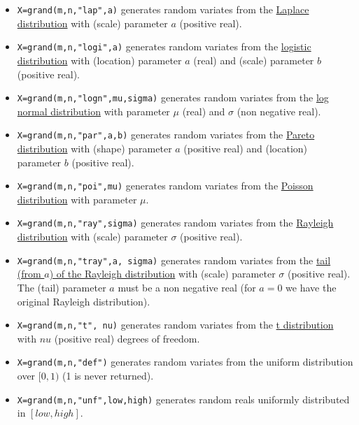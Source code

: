 \begin{description}
\begin{itemize}
\item {} 
  \verb!X=grand(m,n,"lap",a)! generates random variates from the \hyperlink{lappdf}{Laplace 
  distribution} with (scale) parameter $a$ (positive real).
  
\item {} 
  \verb!X=grand(m,n,"logi",a)! generates random variates from the \hyperlink{logipdf}{logistic 
  distribution} with (location) parameter $a$ (real) and (scale) parameter $b$ (positive real).
  
\item {} 
  \verb!X=grand(m,n,"logn",mu,sigma)! generates random variates from the  \hyperlink{lognpdf}{log normal
  distribution} with parameter $\mu$ (real) and  $\sigma$ (non negative real).
  
\item {} 
  \verb!X=grand(m,n,"par",a,b)! generates random variates from the  \hyperlink{parpdf}{Pareto 
  distribution} with (shape) parameter $a$ (positive real) and (location) parameter $b$ (positive real).

\item {} \verb!X=grand(m,n,"poi",mu)! generates random
  variates from the \hyperlink{poipdf}{Poisson distribution} with parameter $\mu$. 
  
\item {} 
  \verb!X=grand(m,n,"ray",sigma)! generates random variates from the  \hyperlink{raypdf}{Rayleigh 
  distribution} with (scale) parameter $\sigma$ (positive real).
  
\item {} 
  \verb!X=grand(m,n,"tray",a, sigma)! generates random variates from the
  \hyperlink{traypdf}{tail (from $a$) of the Rayleigh distribution} with (scale) parameter 
  $\sigma$ (positive real). The (tail) parameter $a$ must be a non negative
  real (for $a=0$ we have the original Rayleigh distribution).

\item {} 
  \verb!X=grand(m,n,"t", nu)! generates random variates from the  \hyperlink{tpdf}{t distribution} 
  with $nu$ (positive real) degrees of freedom. 

\item {} \verb!X=grand(m,n,"def")! generates random variates from the uniform 
  distribution over $[0,1)$ (1 is never returned).

\item {} \verb!X=grand(m,n,"unf",low,high)! generates random reals uniformly distributed 
    in $[low, high]$.


\end{itemize}
\end{description}
